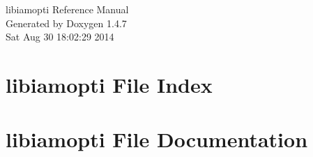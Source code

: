 \documentclass[letterpaper]{book}
\begin{document}
\begin{titlepage}
\vspace*{7cm}
\begin{center}
{\Large libiamopti Reference Manual}\\
\vspace*{1cm}
{\large Generated by Doxygen 1.4.7}\\
\vspace*{0.5cm}
{\small Sat Aug 30 18:02:29 2014}\\
\end{center}
\end{titlepage}
\clearemptydoublepage
{}
\tableofcontents
\clearemptydoublepage
{}
\chapter{libiamopti File Index}

\chapter{libiamopti File Documentation}









\printindex
\end{document}
